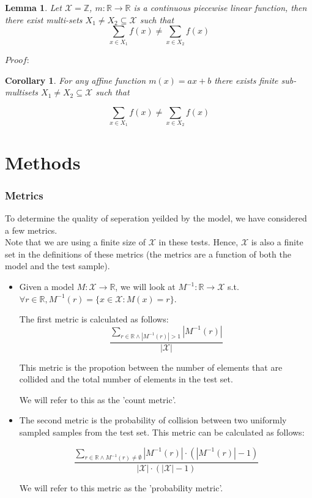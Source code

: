 \documentclass{article}
\newtheorem{lemma}[theorem]{Lemma}
\newtheorem{corollary}{Corollary}[theorem]
\begin{document}
\begin{lemma}
    Let $\mathcal{X}=\mathbb{Z}$, $m:\mathbb{R}\to\mathbb{R}$ is a continuous piecewise linear function,
    then there exist multi-sets $X_1 \neq X_2 \subseteq \mathcal{X}$ such that \\
    \[ \sum_{x\in X_1}f(x) \neq \sum_{x\in X_2}f(x) \]

\end{lemma}
$Proof:$ \\



\begin{corollary}
For any affine function $m(x) = ax + b $ there exists finite sub-multisets $X_1 \neq X_2 \subseteq \mathcal{X}$ such that

\[ \sum_{x\in X_1}f(x) \neq \sum_{x\in X_2}f(x) \]
\end{corollary}





\part*{Methods}
\section*{Metrics}
To determine the quality of seperation yeilded by the model, we have considered a few metrics.\\
Note that we are using a finite size of $\mathcal{X}$ in these tests. Hence, $\mathcal{X}$
is also a finite set in the definitions of these metrics (the metrics are a function of both the model and the test sample).
\begin{itemize}
    \item Given a model $M:\mathcal{X}\rightarrow\mathbb{R}$, 
    we will look at $M^{-1}:\mathbb{R}\rightarrow\mathcal{X}$ s.t. 
    $\forall r\in\mathbb{R}, M^{-1}(r)=\{x\in\mathcal{X}:M(x)=r\}$.

    The first metric is calculated as follows:
    \[
        \frac{\sum_{r\in\mathbb{R}\wedge |M^{-1}(r)|>1}|M^{-1}(r)|}
        {|\mathcal{X}|}
    \]

    This metric is the propotion between the number of elements 
    that are collided and the total number of elements in the test set.
    
    We will refer to this as the 'count metric'.

    \item The second metric is the probability of collision
    between two uniformly sampled samples from the test set.
    This metric can be calculated as follows:

    \[
        \frac{\sum_{r\in\mathbb{R}\wedge M^{-1}(r)\neq\emptyset}|M^{-1}(r)|\cdot\left(|M^{-1}(r)|-1\right)}
        {|\mathcal{X}|\cdot\left(|\mathcal{X}|-1\right)}
    \]

    We will refer to this metric as the 'probability metric'.
\end{itemize}
\end{document}
